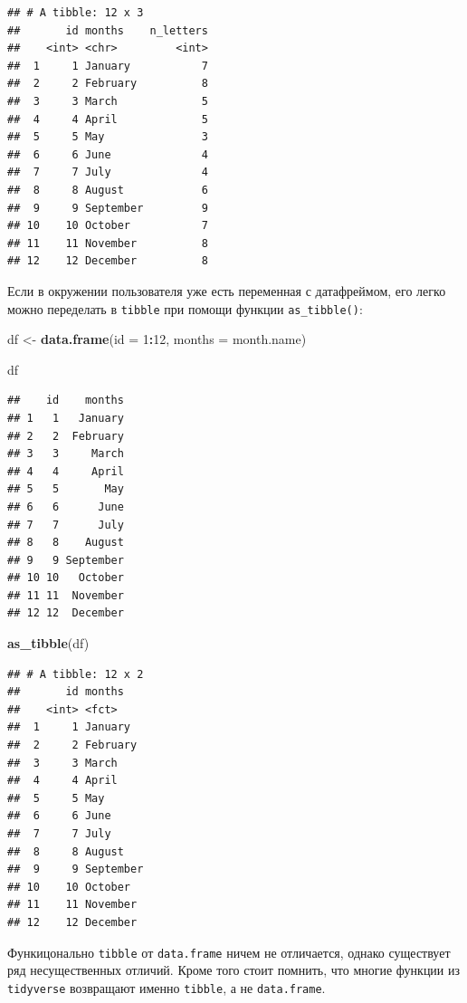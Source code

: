 \documentclass[]{book}
\newenvironment{Shaded}{\begin{snugshade}}{\end{snugshade}}
\newcommand{\DataTypeTok}[1]{\textcolor[rgb]{0.13,0.29,0.53}{#1}}
\newcommand{\DecValTok}[1]{\textcolor[rgb]{0.00,0.00,0.81}{#1}}
\newcommand{\KeywordTok}[1]{\textcolor[rgb]{0.13,0.29,0.53}{\textbf{#1}}}
\newcommand{\NormalTok}[1]{#1}
\newcommand{\OperatorTok}[1]{\textcolor[rgb]{0.81,0.36,0.00}{\textbf{#1}}}
\newcommand{\StringTok}[1]{\textcolor[rgb]{0.31,0.60,0.02}{#1}}
\begin{document}
\begin{verbatim}
## # A tibble: 12 x 3
##       id months    n_letters
##    <int> <chr>         <int>
##  1     1 January           7
##  2     2 February          8
##  3     3 March             5
##  4     4 April             5
##  5     5 May               3
##  6     6 June              4
##  7     7 July              4
##  8     8 August            6
##  9     9 September         9
## 10    10 October           7
## 11    11 November          8
## 12    12 December          8
\end{verbatim}

Если в окружении пользователя уже есть переменная с датафреймом, его легко можно переделать в \texttt{tibble} при помощи функции \texttt{as\_tibble()}:

\begin{Shaded}
\begin{Highlighting}[]
\NormalTok{df <-}\StringTok{ }\KeywordTok{data.frame}\NormalTok{(}\DataTypeTok{id =} \DecValTok{1}\OperatorTok{:}\DecValTok{12}\NormalTok{,}
                 \DataTypeTok{months =}\NormalTok{ month.name)}

\NormalTok{df}
\end{Highlighting}
\end{Shaded}

\begin{verbatim}
##    id    months
## 1   1   January
## 2   2  February
## 3   3     March
## 4   4     April
## 5   5       May
## 6   6      June
## 7   7      July
## 8   8    August
## 9   9 September
## 10 10   October
## 11 11  November
## 12 12  December
\end{verbatim}

\begin{Shaded}
\begin{Highlighting}[]
\KeywordTok{as_tibble}\NormalTok{(df)}
\end{Highlighting}
\end{Shaded}

\begin{verbatim}
## # A tibble: 12 x 2
##       id months   
##    <int> <fct>    
##  1     1 January  
##  2     2 February 
##  3     3 March    
##  4     4 April    
##  5     5 May      
##  6     6 June     
##  7     7 July     
##  8     8 August   
##  9     9 September
## 10    10 October  
## 11    11 November 
## 12    12 December
\end{verbatim}

Функицонально \texttt{tibble} от \texttt{data.frame} ничем не отличается, однако существует ряд несущественных отличий. Кроме того стоит помнить, что многие функции из \texttt{tidyverse} возвращают именно \texttt{tibble}, а не \texttt{data.frame}.
\end{document}
